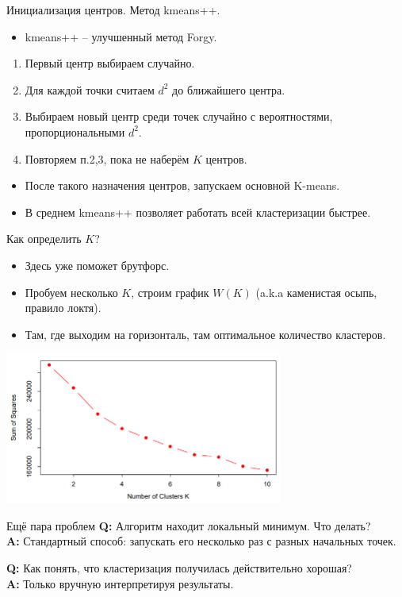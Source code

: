 \documentclass[9pt]{beamer}
\begin{document}
\begin{frame}{Инициализация центров. Метод kmeans++.}
\begin{itemize}
    \item kmeans++ -- улучшенный метод Forgy.
\end{itemize}
\begin{enumerate}
    \item Первый центр выбираем случайно.
    \item Для каждой точки считаем $d^2$ до ближайшего центра.
    \item Выбираем новый центр среди точек случайно с вероятностями, пропорциональными $d^2$.
    \item Повторяем п.2,3, пока не наберём $K$ центров.
\end{enumerate}
\begin{itemize}
    \item После такого назначения центров, запускаем основной K-means.
    \item В среднем kmeans++ позволяет работать всей кластеризации быстрее.
\end{itemize}
\end{frame}

\begin{frame}{Как определить $K$?}
    \begin{itemize}
        \item Здесь уже поможет брутфорс.
        \item Пробуем несколько $K$, строим график $W(K)$ (a.k.a каменистая осыпь, правило локтя).
        \item Там, где выходим на горизонталь, там оптимальное количество кластеров.
    \end{itemize}
\begin{center}
    \includegraphics[height=5cm]{img/elbow_rule.png}
\end{center}
\end{frame}

\begin{frame}{Ещё пара проблем}
\textbf{Q:} Алгоритм находит локальный минимум. Что делать?\\
\textbf{A:} Стандартный способ: запускать его несколько раз с разных начальных точек.

\textbf{Q:} Как понять, что кластеризация получилась действительно хорошая?\\
\textbf{A:} Только вручную интерпретируя результаты.
\end{frame}
\end{document}
